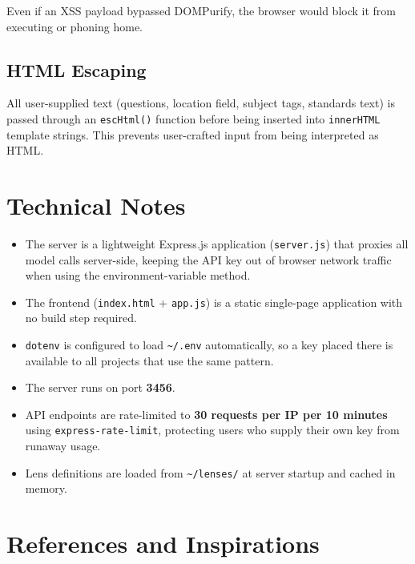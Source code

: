 \documentclass[11pt]{article}
\begin{document}
Even if an XSS payload bypassed DOMPurify, the browser would block it
from executing or phoning home.

\subsection{HTML Escaping}

All user-supplied text (questions, location field, subject tags, standards
text) is passed through an \texttt{escHtml()} function before being
inserted into \texttt{innerHTML} template strings. This prevents
user-crafted input from being interpreted as HTML.

\section{Technical Notes}

\begin{itemize}
  \item The server is a lightweight Express.js application
        (\texttt{server.js}) that proxies all model calls server-side,
        keeping the API key out of browser network traffic when using the
        environment-variable method.
  \item The frontend (\texttt{index.html} + \texttt{app.js}) is a static
        single-page application with no build step required.
  \item \texttt{dotenv} is configured to load \texttt{\textasciitilde/.env}
        automatically, so a key placed there is available to all projects
        that use the same pattern.
  \item The server runs on port \textbf{3456}.
  \item API endpoints are rate-limited to \textbf{30 requests per IP per
        10 minutes} using \texttt{express-rate-limit}, protecting users
        who supply their own key from runaway usage.
  \item Lens definitions are loaded from \texttt{\textasciitilde/lenses/}
        at server startup and cached in memory.
\end{itemize}

\section{References and Inspirations}
\end{document}
